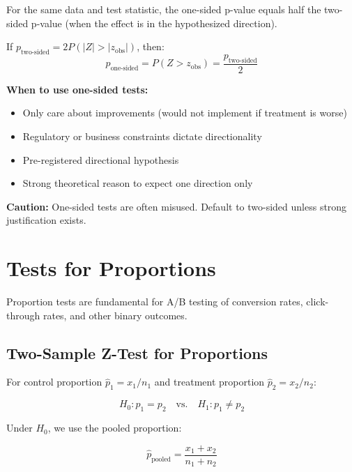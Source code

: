 \begin{theorem}
For the same data and test statistic, the one-sided p-value equals half the two-sided p-value (when the effect is in the hypothesized direction).

If $p_{\text{two-sided}} = 2P(|Z| > |z_{\text{obs}}|)$, then:
\begin{equation}
p_{\text{one-sided}} = P(Z > z_{\text{obs}}) = \frac{p_{\text{two-sided}}}{2}
\end{equation}
\end{theorem}

\textbf{When to use one-sided tests:}
\begin{itemize}
    \item Only care about improvements (would not implement if treatment is worse)
    \item Regulatory or business constraints dictate directionality
    \item Pre-registered directional hypothesis
    \item Strong theoretical reason to expect one direction only
\end{itemize}

\textbf{Caution:} One-sided tests are often misused. Default to two-sided unless strong justification exists.

\section{Tests for Proportions}

Proportion tests are fundamental for A/B testing of conversion rates, click-through rates, and other binary outcomes.

\subsection{Two-Sample Z-Test for Proportions}

For control proportion $\hat{p}_1 = x_1/n_1$ and treatment proportion $\hat{p}_2 = x_2/n_2$:

\begin{equation}
H_0: p_1 = p_2 \quad \text{vs.} \quad H_1: p_1 \neq p_2
\end{equation}

Under $H_0$, we use the pooled proportion:

\begin{equation}
\hat{p}_{\text{pooled}} = \frac{x_1 + x_2}{n_1 + n_2}
\end{equation}

